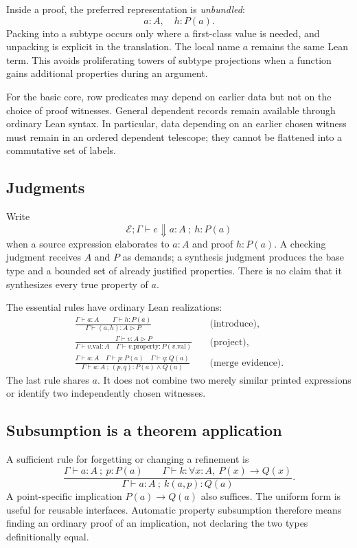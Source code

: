 \documentclass[11pt,a4paper]{article}
\newcommand{\RType}[2]{#1\mathbin{\triangleright}#2}
\theoremstyle{definition}
\begin{document}
Inside a proof, the preferred representation is \emph{unbundled}:
\[
 a:A,\quad h:P(a).
\]
Packing into a subtype occurs only where a first-class value is needed, and
unpacking is explicit in the translation. The local name $a$ remains the same
Lean term. This avoids proliferating towers of subtype projections when a
function gains additional properties during an argument.

For the basic core, row predicates may depend on earlier data but not on the
choice of proof witnesses. General dependent records remain available through
ordinary Lean syntax. In particular, data depending on an earlier chosen
witness must remain in an ordered dependent telescope; they cannot be flattened
into a commutative set of labels.

\subsection{Judgments}
Write
\[
 \mathcal E;\Gamma\vdash e\Downarrow a:A\ ;\ h:P(a)
\]
when a source expression elaborates to $a:A$ and proof $h:P(a)$.
A checking judgment receives $A$ and $P$ as demands; a synthesis judgment
produces the base type and a bounded set of already justified properties.
There is no claim that it synthesizes every true property of $a$.

The essential rules have ordinary Lean realizations:
\begin{align*}
 \frac{\Gamma\vdash a:A\qquad\Gamma\vdash h:P(a)}
 {\Gamma\vdash (a,h):\RType{A}{P}}
 &\quad\text{(introduce)},\\[1ex]
 \frac{\Gamma\vdash v:\RType{A}{P}}
 {\Gamma\vdash v.\mathrm{val}:A\quad
  \Gamma\vdash v.\mathrm{property}:P(v.\mathrm{val})}
 &\quad\text{(project)},\\[1ex]
 \frac{\Gamma\vdash a:A\quad\Gamma\vdash p:P(a)\quad
       \Gamma\vdash q:Q(a)}
 {\Gamma\vdash a:A\ ;\ (p,q):P(a)\land Q(a)}
 &\quad\text{(merge evidence)}.
\end{align*}
The last rule shares $a$. It does not combine two merely similar printed
expressions or identify two independently chosen witnesses.

\subsection{Subsumption is a theorem application}
A sufficient rule for forgetting or changing a refinement is
\begin{equation}\label{eq:subsumption}
 \frac{\Gamma\vdash a:A\ ;\ p:P(a)\qquad
       \Gamma\vdash k:\forall x:A,\ P(x)\to Q(x)}
 {\Gamma\vdash a:A\ ;\ k(a,p):Q(a)}.
\end{equation}
A point-specific implication $P(a)\to Q(a)$ also suffices. The uniform form is
useful for reusable interfaces. Automatic property subsumption therefore means
finding an ordinary proof of an implication, not declaring the two types
definitionally equal.
\end{document}
